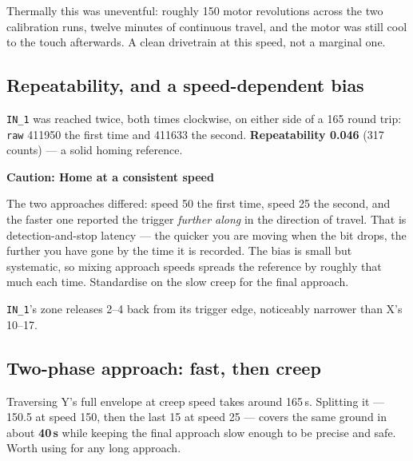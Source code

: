 \documentclass[11pt,letterpaper]{article}
\newenvironment{caution}[1]{%
    \par\addvspace{8pt}%
    \noindent{\color{cautionred}\rule{\linewidth}{0.8pt}}\par\vspace{2pt}
    \noindent\textbf{\color{cautionred}Caution: #1}\par\vspace{2pt}
}{%
    \par\vspace{2pt}\noindent{\color{cautionred}\rule{\linewidth}{0.4pt}}%
    \par\addvspace{8pt}%
}
\begin{document}
Thermally this was uneventful: roughly 150 motor revolutions across the two
calibration runs, twelve minutes of continuous travel, and the motor was still
cool to the touch afterwards. A clean drivetrain at this speed, not a marginal
one.

\subsection{Repeatability, and a speed-dependent bias}
\texttt{IN\_1} was reached twice, both times clockwise, on either side of a
165\textdegree{} round trip: \texttt{raw} 411950 the first time and 411633 the
second. \textbf{Repeatability 0.046\textdegree{}} (317 counts) --- a solid homing
reference.

\begin{caution}{Home at a consistent speed}
The two approaches differed: speed 50 the first time, speed 25 the second, and the
faster one reported the trigger \emph{further along} in the direction of travel.
That is detection-and-stop latency --- the quicker you are moving when the bit
drops, the further you have gone by the time it is recorded. The bias is small but
systematic, so mixing approach speeds spreads the reference by roughly that much
each time. Standardise on the slow creep for the final approach.
\end{caution}

\texttt{IN\_1}'s zone releases 2--4\textdegree{} back from its trigger edge,
noticeably narrower than X's 10--17\textdegree{}.

\subsection{Two-phase approach: fast, then creep}
Traversing Y's full envelope at creep speed takes around 165\,s. Splitting it ---
150.5\textdegree{} at speed 150, then the last 15\textdegree{} at speed 25 ---
covers the same ground in about \textbf{40\,s} while keeping the final approach
slow enough to be precise and safe. Worth using for any long approach.
\end{document}
